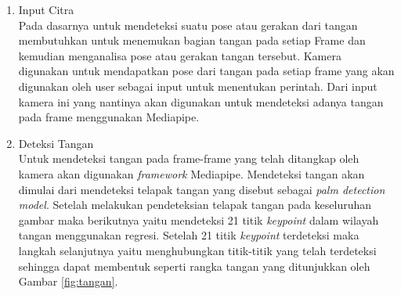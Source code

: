\begin{enumerate}
\begin{enumerate}
  \item Input Citra \\
  Pada dasarnya untuk mendeteksi suatu pose atau gerakan dari tangan membutuhkan untuk menemukan bagian tangan pada setiap Frame dan kemudian menganalisa pose atau gerakan tangan tersebut. Kamera digunakan untuk mendapatkan pose dari tangan pada setiap frame yang akan digunakan oleh user sebagai input untuk menentukan perintah. Dari input kamera ini yang nantinya akan digunakan untuk mendeteksi adanya tangan pada frame menggunakan Mediapipe.
  \item Deteksi Tangan \\
  Untuk mendeteksi tangan pada frame-frame yang telah ditangkap oleh kamera akan digunakan \textit{framework} Mediapipe. Mendeteksi tangan akan dimulai dari mendeteksi telapak tangan yang disebut sebagai \textit{palm detection model}. Setelah melakukan pendeteksian telapak tangan pada keseluruhan gambar maka berikutnya yaitu mendeteksi 21 titik \textit{keypoint} dalam wilayah tangan menggunakan regresi. Setelah 21 titik \textit{keypoint} terdeteksi maka langkah selanjutnya yaitu menghubungkan titik-titik yang telah terdeteksi sehingga dapat membentuk seperti rangka tangan yang ditunjukkan oleh Gambar \ref*{fig:tangan}.


\end{enumerate}
\end{enumerate}
